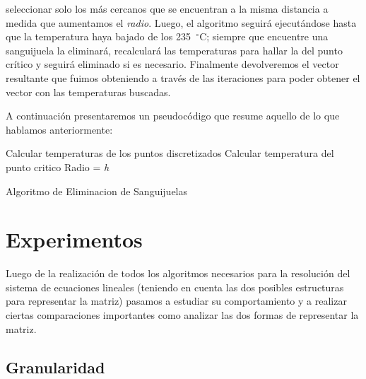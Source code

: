 \documentclass[10pt, a4paper]{article}
\begin{document}
seleccionar solo los m\'as cercanos que se encuentran a la misma distancia a medida que aumentamos el \textit{radio}. Luego, el algoritmo seguir\'a ejecut\'andose hasta que la temperatura haya bajado de los 235\hspace{-1.5mm}$\phantom{a}^{\circ}$C; siempre que encuentre una sanguijuela la eliminar\'a, recalcular\'a las temperaturas para hallar la del punto cr\'itico y seguir\'a eliminado si es necesario. Finalmente devolveremos el vector resultante que fuimos obteniendo a trav\'es de las iteraciones para poder obtener el vector con las temperaturas buscadas.

A continuaci\'on presentaremos un pseudoc\'odigo que resume aquello de lo que hablamos anteriormente:

\vspace{5mm}
\begin{algorithm}[H]
Calcular temperaturas de los puntos discretizados\;
Calcular temperatura del punto critico\;
Radio = \textit{h}\;

\caption{Algoritmo de Eliminacion de Sanguijuelas}
\end{algorithm}	

\newpage 

\section{Experimentos}

Luego de la realizaci\'on de todos los algoritmos necesarios para la resoluci\'on del sistema de ecuaciones lineales (teniendo en cuenta las dos posibles estructuras para representar la matriz) pasamos a estudiar su comportamiento y a realizar ciertas comparaciones importantes como analizar las dos formas de representar la matriz.

\subsection{Granularidad}
\end{document}
